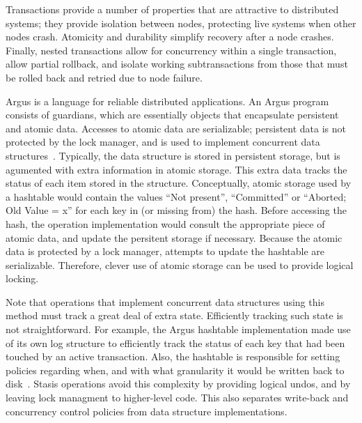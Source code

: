 \documentclass[letterpaper,twocolumn,10pt]{article}
\newcommand{\yad}{Stasis\xspace}
\begin{document}

Transactions provide a number of properties that are attractive to
distributed systems; they provide isolation between nodes, protecting
live systems when other nodes crash.  Atomicity and durability
simplify recovery after a node crashes.  Finally, nested transactions
allow for concurrency within a single transaction, allow partial
rollback, and isolate working subtransactions from those that must be
rolled back and retried due to node failure.

Argus is a language for reliable distributed applications.  An Argus
program consists of guardians, which are essentially objects that
encapsulate persistent and atomic data.  Accesses to atomic data are 
serializable; persistent data is not protected by the lock manager, 
and is used to implement concurrent data structures~\cite{argus}.  
Typically, the data structure is stored in persistent storage, but is agumented with
extra information in atomic storage.  This extra data tracks the
status of each item stored in the structure.  Conceptually, atomic 
storage used by a hashtable would contain the values ``Not present'',
``Committed'' or ``Aborted; Old Value = x'' for each key in (or
missing from) the hash.  Before accessing the hash, the operation
implementation would consult the appropriate piece of atomic data, and
update the persitent storage if necessary.  Because the atomic data is
protected by a lock manager, attempts to update the hashtable are serializable.
Therefore, clever use of atomic storage can be used to provide logical locking.

Note that operations that implement concurrent data structures using
this method must track a great deal of extra state.  Efficiently
tracking such state is not straightforward.  For example, the Argus
hashtable implementation made use of its own log structure to
efficiently track the status of each key that had been touched by an
active transaction.  Also, the hashtable is responsible for setting
policies regarding when, and with what granularity it would be written
back to disk~\cite{argusImplementation}.  \yad operations avoid this
complexity by providing logical undos, and by leaving lock managment
to higher-level code.  This also separates write-back and concurrency
control policies from data structure implementations.
\end{document}
